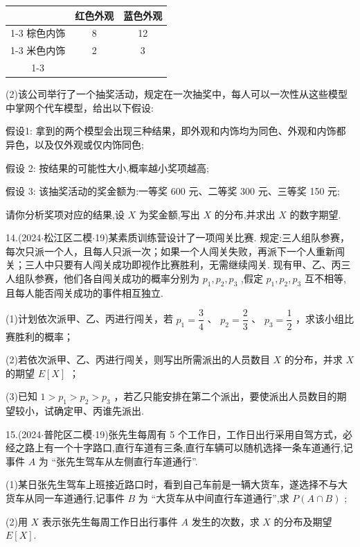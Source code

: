 \begin{center}

\begin{tabular}{|c|c|c|}
\hline
\phantom{X} & 红色外观 & 蓝色外观 \\
\cline{1-3}
棕色内饰 & 8 & 12 \\
\cline{1-3}
米色内饰 & 2 & 3 \\
\cline{1-3}
\hline
\end{tabular}
\end{center}

(2)该公司举行了一个抽奖活动，规定在一次抽奖中，每人可以一次性从这些模型中掌网个代车模型，给出以下假设:

假设1: 拿到的两个模型会出现三种结果，即外观和内饰均为同色、外观和内饰都异色，以及仅外观或仅内饰同色;

假设 2: 按结果的可能性大小,概率越小奖项越高;

假设 3: 该抽奖活动的奖金额为:一等奖 600 元、二等奖 300 元、三等奖 150 元;

请你分析奖项对应的结果,设 $X$ 为奖金额,写出 $X$ 的分布,并求出 $X$ 的数字期望.

14.(2024$\cdot$松江区二模$\cdot$19)某素质训练营设计了一项闯关比赛. 规定:三人组队参赛，每次只派一个人，且每人只派一次；如果一个人闯关失败，再派下一个人重新闯关；三人中只要有人闯关成功即视作比赛胜利，无需继续闯关. 现有甲、乙、丙三人组队参赛，他们各自闯关成功的概率分别为 ${p}_{1},{p}_{2},{p}_{3}$ ,假定 ${p}_{1},{p}_{2},{p}_{3}$ 互不相等,且每人能否闯关成功的事件相互独立.

(1)计划依次派甲、乙、丙进行闯关，若 ${p}_{1} = \dfrac{3}{4}$ 、 ${p}_{2} = \dfrac{2}{3}$ 、 ${p}_{3} = \dfrac{1}{2}$ ，求该小组比赛胜利的概率；

(2)若依次派甲、乙、丙进行闯关，则写出所需派出的人员数目 $X$ 的分布，并求 $X$ 的期望 $E\left\lbrack  X\right\rbrack$ ；

(3)已知 $1 > {p}_{1} > {p}_{2} > {p}_{3}$ ，若乙只能安排在第二个派出，要使派出人员数目的期望较小，试确定甲、丙谁先派出.

15.(2024$\cdot$普陀区二模$\cdot$19)张先生每周有 5 个工作日，工作日出行采用自驾方式，必经之路上有一个十字路口,直行车道有三条,直行车辆可以随机选择一条车道通行,记事件 $A$ 为 “张先生驾车从左侧直行车道通行”.

(1)某日张先生驾车上班接近路口时，看到自己车前是一辆大货车，遂选择不与大货车从同一车道通行,记事件 $B$ 为 “大货车从中间直行车道通行”,求 $P\left( {A \cap  B}\right)$ ;

(2)用 $X$ 表示张先生每周工作日出行事件 $A$ 发生的次数，求 $X$ 的分布及期望 $E\left\lbrack  X\right\rbrack$.

